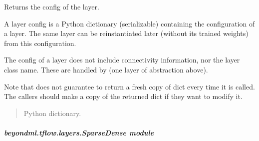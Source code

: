 \documentclass[letterpaper,10pt,english]{sphinxmanual}
\begin{document}
\begin{fulllineitems}
\begin{fulllineitems}
\end{fulllineitems}


\begin{fulllineitems}
\label{\detokenize{beyondml.tflow.layers:beyondml.tflow.layers.SparseConv3D.SparseConv3D.get_config}}
\pysigstartsignatures
{}
\pysigstopsignatures
\sphinxAtStartPar
Returns the config of the layer.

\sphinxAtStartPar
A layer config is a Python dictionary (serializable)
containing the configuration of a layer.
The same layer can be reinstantiated later
(without its trained weights) from this configuration.

\sphinxAtStartPar
The config of a layer does not include connectivity
information, nor the layer class name. These are handled
by  (one layer of abstraction above).

\sphinxAtStartPar
Note that  does not guarantee to return a fresh copy of
dict every time it is called. The callers should make a copy of the
returned dict if they want to modify it.
\begin{quote}\begin{description}
\sphinxAtStartPar
Python dictionary.

\end{description}\end{quote}

\end{fulllineitems}


\end{fulllineitems}



\subparagraph{beyondml.tflow.layers.SparseDense module}
\label{\detokenize{beyondml.tflow.layers:module-beyondml.tflow.layers.SparseDense}}\label{\detokenize{beyondml.tflow.layers:beyondml-tflow-layers-sparsedense-module}}
\end{document}
